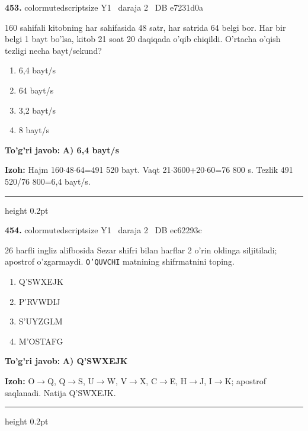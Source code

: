 \documentclass[10pt,a4paper,oneside]{article}
\begin{document}
\noindent\textbf{\color{ink}453.}  {color{muted}scriptsize Y1 \textbullet\ daraja 2 \textbullet\ DB e7231d0a}
\par
160 sahifali kitobning har sahifasida 48 satr, har satrida 64 belgi bor. Har bir belgi 1 bayt bo'lsa, kitob 21 soat 20 daqiqada o'qib chiqildi. O'rtacha o'qish tezligi necha bayt/sekund?
\begin{enumerate}[label=\Alph*),leftmargin=9mm]
\item 6,4 bayt/s
\item 64 bayt/s
\item 3,2 bayt/s
\item 8 bayt/s
\end{enumerate}
\begin{tcolorbox}[enhanced,breakable,colback=teal!4,colframe=teal!50!black,boxrule=0.5pt,arc=1.1mm,left=3mm,right=3mm,top=1.7mm,bottom=1.7mm,before skip=2mm,after skip=2mm]
\textbf{\color{teal}To'g'ri javob:} \textbf{A) 6,4 bayt/s}
\par\smallskip
\textbf{Izoh:} Hajm 160\ensuremath{\cdot}48\ensuremath{\cdot}64=491 520 bayt. Vaqt 21\ensuremath{\cdot}3600+20\ensuremath{\cdot}60=76 800 s. Tezlik 491 520/76 800=6,4 bayt/s.
\end{tcolorbox}
\vspace{2mm}\hrule height 0.2pt \vspace{3mm}

\noindent\textbf{\color{ink}454.}  {color{muted}scriptsize Y1 \textbullet\ daraja 2 \textbullet\ DB ec62293c}
\par
26 harfli ingliz alifbosida Sezar shifri bilan harflar 2 o'rin oldinga siljitiladi; apostrof o'zgarmaydi. \texttt{O'QUVCHI} matnining shifrmatnini toping.
\begin{enumerate}[label=\Alph*),leftmargin=9mm]
\item Q'SWXEJK
\item P'RVWDIJ
\item S'UYZGLM
\item M'OSTAFG
\end{enumerate}
\begin{tcolorbox}[enhanced,breakable,colback=teal!4,colframe=teal!50!black,boxrule=0.5pt,arc=1.1mm,left=3mm,right=3mm,top=1.7mm,bottom=1.7mm,before skip=2mm,after skip=2mm]
\textbf{\color{teal}To'g'ri javob:} \textbf{A) Q'SWXEJK}
\par\smallskip
\textbf{Izoh:} O\ensuremath{\to}Q, Q\ensuremath{\to}S, U\ensuremath{\to}W, V\ensuremath{\to}X, C\ensuremath{\to}E, H\ensuremath{\to}J, I\ensuremath{\to}K; apostrof saqlanadi. Natija Q'SWXEJK.
\end{tcolorbox}
\vspace{2mm}\hrule height 0.2pt \vspace{3mm}
\end{document}
